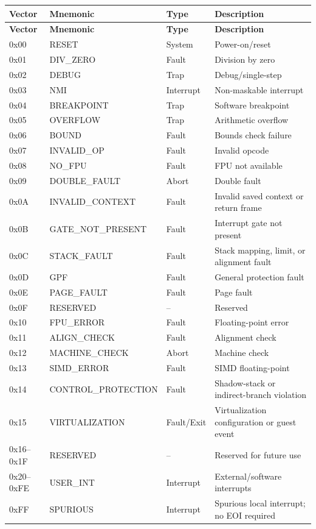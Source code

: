 \documentclass[11pt]{article}
\begin{document}
\begin{longtable}{@{}llll@{}}
\toprule
\textbf{Vector} & \textbf{Mnemonic} & \textbf{Type} & \textbf{Description} \\ \midrule
\endfirsthead
\toprule
\textbf{Vector} & \textbf{Mnemonic} & \textbf{Type} & \textbf{Description} \\ \midrule
\endhead
0x00 & RESET & System & Power-on/reset \\
0x01 & DIV\_ZERO & Fault & Division by zero \\
0x02 & DEBUG & Trap & Debug/single-step \\
0x03 & NMI & Interrupt & Non-maskable interrupt \\
0x04 & BREAKPOINT & Trap & Software breakpoint \\
0x05 & OVERFLOW & Trap & Arithmetic overflow \\
0x06 & BOUND & Fault & Bounds check failure \\
0x07 & INVALID\_OP & Fault & Invalid opcode \\
0x08 & NO\_FPU & Fault & FPU not available \\
0x09 & DOUBLE\_FAULT & Abort & Double fault \\
0x0A & INVALID\_CONTEXT & Fault & Invalid saved context or return frame \\
0x0B & GATE\_NOT\_PRESENT & Fault & Interrupt gate not present \\
0x0C & STACK\_FAULT & Fault & Stack mapping, limit, or alignment fault \\
0x0D & GPF & Fault & General protection fault \\
0x0E & PAGE\_FAULT & Fault & Page fault \\
0x0F & RESERVED & -- & Reserved \\
0x10 & FPU\_ERROR & Fault & Floating-point error \\
0x11 & ALIGN\_CHECK & Fault & Alignment check \\
0x12 & MACHINE\_CHECK & Abort & Machine check \\
0x13 & SIMD\_ERROR & Fault & SIMD floating-point \\
0x14 & CONTROL\_PROTECTION & Fault & Shadow-stack or indirect-branch violation \\
0x15 & VIRTUALIZATION & Fault/Exit & Virtualization configuration or guest event \\
0x16--0x1F & RESERVED & -- & Reserved for future use \\
0x20--0xFE & USER\_INT & Interrupt & External/software interrupts \\
0xFF & SPURIOUS & Interrupt & Spurious local interrupt; no EOI required \\ \bottomrule
\end{longtable}
\end{document}
